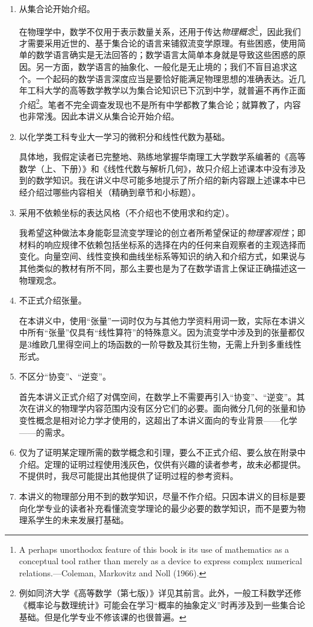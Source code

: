 \documentclass[main.tex]{subfiles}
\begin{document}
\begin{enumerate}
    \item 从集合论开始介绍。

          在物理学中，数学不仅用于表示数量关系，还用于传达\emph{物理概念}\footnote{A perhaps unorthodox feature of this book is its use of mathematics as a conceptual tool rather than merely as a device to express complex numerical relations.---Coleman, Markovitz and Noll (1966)\cite{Coleman1966}.}，因此我们才需要采用近世的、基于集合论的语言来铺叙流变学原理。有些困惑，使用简单的数学语言确实是无法回答的；数学语言太简单本身就是导致这些困惑的原因。另一方面，数学语言的抽象化、一般化是无止境的；我们不盲目追求这个。一个起码的数学语言深度应当是要恰好能满足物理思想的准确表达。近几年工科大学的高等数学教学以为集合论知识已下沉到中学，就普遍不再作正面介绍\footnote{例如同济大学《高等数学（第七版）》详见其前言。此外，一般工科数学还修《概率论与数理统计》可能会在学习“概率的抽象定义”时再涉及到一些集合论基础。但是化学专业不修该课的也很普遍。}。笔者不完全调查发现也不是所有中学都教了集合论；就算教了，内容也非常浅。因此本讲义从集合论开始介绍。
    \item 以化学类工科专业大一学习的微积分和线性代数为基础。

          具体地，我假定读者已完整地、熟练地掌握华南理工大学数学系编著的《高等数学（上、下册）》和《线性代数与解析几何》，故只介绍上述课本中没有涉及到的数学知识。我在讲义中尽可能多地提示了所介绍的新内容跟上述课本中已经介绍过哪些内容相关（精确到章节和小标题）。
    \item 采用不依赖坐标的表达风格（不介绍也不使用求和约定）。

          我希望这种做法本身能彰显流变学理论的创立者所希望保证的\emph{物理客观性}；即材料的响应规律不依赖包括坐标系的选择在内的任何来自观察者的主观选择而变化。向量空间、线性变换和曲线坐标系等知识的纳入和介绍方式，如果说与其他类似的教材有所不同，那么主要也是为了在数学语言上保证正确描述这一物理观念。
    \item 不正式介绍张量。

          在本讲义中，使用“张量”一词时仅为与其他力学资料用词一致，实际在本讲义中所有“张量”仅具有“线性算符”的特殊意义。因为流变学中涉及到的张量都仅是3维欧几里得空间上的场函数的一阶导数及其衍生物，无需上升到多重线性形式。
    \item 不区分“协变”、“逆变”。

          首先本讲义正式介绍了对偶空间，在数学上不需要再引入“协变”、“逆变”。其次在讲义的物理学内容范围内没有区分它们的必要。面向微分几何的张量和协变性概念是相对论力学才使用的，这超出了本讲义面向的专业背景——化学——的需求。
    \item 仅为了证明某定理所需的数学概念和引理，要么不正式介绍、要么放在附录中介绍。定理的证明过程使用浅灰色，仅供有兴趣的读者参考，故未必都提供。不提供时，我尽可能提出其他提供了证明过程的参考资料。
    \item 本讲义的物理部分用不到的数学知识，尽量不作介绍。只因本讲义的目标是要向化学专业的读者补充看懂流变学理论的最少必要的数学知识，而不是要为物理系学生的未来发展打基础。
\end{enumerate}
\end{document}
